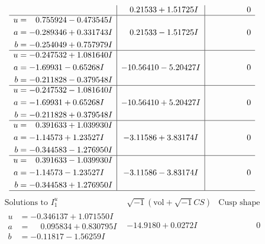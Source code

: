 \documentclass[1p]{elsarticle_modified}
\theoremstyle{definition}
\newcommand{\I}{\sqrt{-1}}
\begin{document}
$$\begin{array}{c|c|c}
 & \phantom{-}0.21533 + 1.51725 I & \phantom{-0.000000 } 0 \\ \hline\begin{aligned}
u &= \phantom{-}0.755924 - 0.473545 I \\
a &= -0.289346 + 0.331743 I \\
b &= -0.254049 + 0.757979 I\end{aligned}
 & \phantom{-}0.21533 - 1.51725 I & \phantom{-0.000000 } 0 \\ \hline\begin{aligned}
u &= -0.247532 + 1.081640 I \\
a &= -1.69931 - 0.65268 I \\
b &= -0.211828 - 0.379548 I\end{aligned}
 & -10.56410 - 5.20427 I & \phantom{-0.000000 } 0 \\ \hline\begin{aligned}
u &= -0.247532 - 1.081640 I \\
a &= -1.69931 + 0.65268 I \\
b &= -0.211828 + 0.379548 I\end{aligned}
 & -10.56410 + 5.20427 I & \phantom{-0.000000 } 0 \\ \hline\begin{aligned}
u &= \phantom{-}0.391633 + 1.039930 I \\
a &= -1.14573 + 1.23527 I \\
b &= -0.344583 - 1.276950 I\end{aligned}
 & -3.11586 + 3.83174 I & \phantom{-0.000000 } 0 \\ \hline\begin{aligned}
u &= \phantom{-}0.391633 - 1.039930 I \\
a &= -1.14573 - 1.23527 I \\
b &= -0.344583 + 1.276950 I\end{aligned}
 & -3.11586 - 3.83174 I & \phantom{-0.000000 } 0\\
 \hline 
 \end{array}$$\newpage$$\begin{array}{c|c|c}  
\text{Solutions to }I^u_{1}& \I (\text{vol} + \sqrt{-1}CS) & \text{Cusp shape}\\
 \hline 
\begin{aligned}
u &= -0.346137 + 1.071550 I \\
a &= \phantom{-}0.095834 + 0.830795 I \\
b &= -0.11817 - 1.56259 I\end{aligned}
 & -14.9180 + 0.0272 I & \phantom{-0.000000 } 0 \\ \hline\begin{aligned}

\end{aligned}
\end{array}$$
\end{document}
